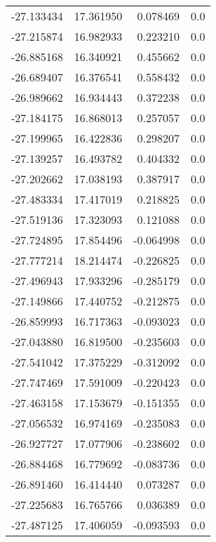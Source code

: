 \begin{tabular}{rrrr}
      -27.133434 &        17.361950 &    0.078469 &   0.0 \\
      -27.215874 &        16.982933 &    0.223210 &   0.0 \\
      -26.885168 &        16.340921 &    0.455662 &   0.0 \\
      -26.689407 &        16.376541 &    0.558432 &   0.0 \\
      -26.989662 &        16.934443 &    0.372238 &   0.0 \\
      -27.184175 &        16.868013 &    0.257057 &   0.0 \\
      -27.199965 &        16.422836 &    0.298207 &   0.0 \\
      -27.139257 &        16.493782 &    0.404332 &   0.0 \\
      -27.202662 &        17.038193 &    0.387917 &   0.0 \\
      -27.483334 &        17.417019 &    0.218825 &   0.0 \\
      -27.519136 &        17.323093 &    0.121088 &   0.0 \\
      -27.724895 &        17.854496 &   -0.064998 &   0.0 \\
      -27.777214 &        18.214474 &   -0.226825 &   0.0 \\
      -27.496943 &        17.933296 &   -0.285179 &   0.0 \\
      -27.149866 &        17.440752 &   -0.212875 &   0.0 \\
      -26.859993 &        16.717363 &   -0.093023 &   0.0 \\
      -27.043880 &        16.819500 &   -0.235603 &   0.0 \\
      -27.541042 &        17.375229 &   -0.312092 &   0.0 \\
      -27.747469 &        17.591009 &   -0.220423 &   0.0 \\
      -27.463158 &        17.153679 &   -0.151355 &   0.0 \\
      -27.056532 &        16.974169 &   -0.235083 &   0.0 \\
      -26.927727 &        17.077906 &   -0.238602 &   0.0 \\
      -26.884468 &        16.779692 &   -0.083736 &   0.0 \\
      -26.891460 &        16.414440 &    0.073287 &   0.0 \\
      -27.225683 &        16.765766 &    0.036389 &   0.0 \\
      -27.487125 &        17.406059 &   -0.093593 &   0.0 \\

\end{tabular}
